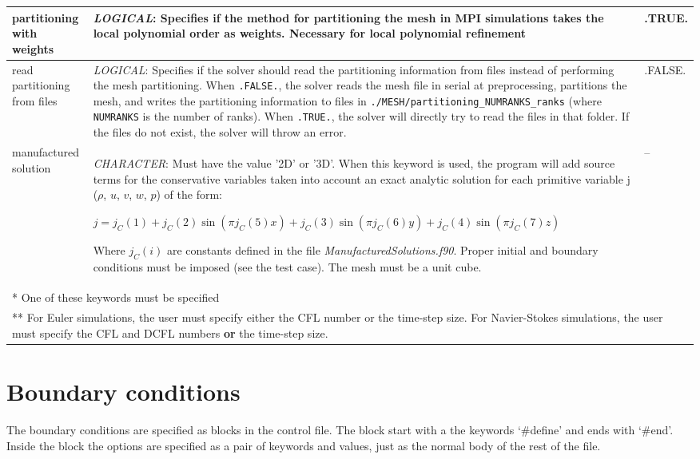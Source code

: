 \documentclass[a4paper,10pt]{report}
\begin{document}
\begin{longtable}{|p{4cm}|p{10cm}|p{2.2cm}|}
partitioning with weights & \textit{LOGICAL}: Specifies if the method for partitioning the mesh in MPI simulations takes the local polynomial order as weights. Necessary for local polynomial refinement & .TRUE. \\ \hline

read partitioning from files & \textit{LOGICAL}: Specifies if the solver should read the partitioning information from files instead of performing the mesh partitioning. When \texttt{.FALSE.}, the solver reads the mesh file in serial at preprocessing, partitions the mesh, and writes the partitioning information to files in \texttt{./MESH/partitioning\_NUMRANKS\_ranks} (where \texttt{NUMRANKS} is the number of ranks). When \texttt{.TRUE.}, the solver will directly try to read the files in that folder. If the files do not exist, the solver will throw an error. & .FALSE. \\ \hline

manufactured solution & \textit{CHARACTER}: Must have the value '2D' or '3D'. When this keyword is used, the program will add source terms for the conservative variables taken into account an exact analytic solution for each primitive variable j ($\rho$, $u$, $v$, $w$, $p$) of the form:\

$j = j_C(1) + j_C(2) \sin(\pi j_C(5) x) + j_C(3) \sin(\pi j_C(6) y) + j_C(4) \sin(\pi j_C(7) z) $\

Where $j_C(i)$ are constants defined in the file \textit{ManufacturedSolutions.f90}. Proper initial and boundary conditions must be imposed (see the test case). The mesh must be a unit cube.
  & -- \\ \hline

\multicolumn{3}{p{16.4cm}}{*  One of these keywords must be specified} \\

\multicolumn{3}{p{16.4cm}}{** For Euler simulations, the user must specify either the CFL number or the time-step size. For Navier-Stokes simulations, the user must specify the CFL and DCFL numbers \textbf{or} the time-step size.}

\end{longtable}

\section{Boundary conditions}

The boundary conditions are specified as blocks in the control file. The block start with a the keywords `\#define' and ends with `\#end'. Inside the block the options are specified as a pair of keywords and values, just as the normal body of the rest of the file.
\end{document}
